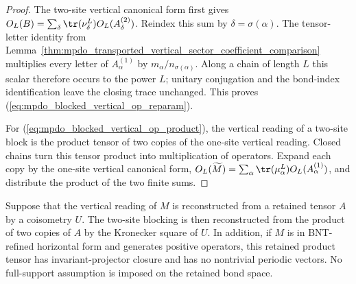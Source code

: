 \begin{proof}\leanok
    The two-site vertical canonical form first gives
    $O_L(B)=\sum_\delta\tr(\nu_\delta^L)
        O_L(A^{(2)}_\delta)$.
    Reindex this sum by $\delta=\sigma(\alpha)$. The tensor-letter identity
    from Lemma~\ref{thm:mpdo_transported_vertical_sector_coefficient_comparison}
    multiplies every letter of $A^{(1)}_\alpha$ by
    $m_\alpha/n_{\sigma(\alpha)}$. Along a chain of length $L$ this scalar
    therefore occurs to the power $L$; unitary conjugation and the bond-index
    identification leave the closing trace unchanged. This proves
    (\ref{eq:mpdo_blocked_vertical_op_reparam}).

    For (\ref{eq:mpdo_blocked_vertical_op_product}), the vertical reading of a two-site block is the
    product tensor of two copies of the one-site vertical reading. Closed
    chains turn this tensor product into multiplication of operators. Expand
    each copy by the one-site vertical canonical form,
    $O_L(\widetilde M)=\sum_\alpha
        \tr(\mu_\alpha^L)O_L(A^{(1)}_\alpha)$,
    and distribute the product of the two finite sums.
\end{proof}

\begin{lemma}
    \label{thm:mpdo_retained_vertical_product_canonical_hypotheses}
    \leanok
    Suppose that the vertical reading of $M$ is reconstructed from a retained
    tensor $A$ by a coisometry $U$. The two-site blocking is then reconstructed
    from the product of two copies of $A$ by the Kronecker square of $U$.
    In addition, if $M$ is in BNT-refined horizontal form and generates
    positive operators, this retained product tensor has invariant-projector closure
    and has no nontrivial periodic vectors. No full-support assumption is
    imposed on the retained bond space.
\end{lemma}

